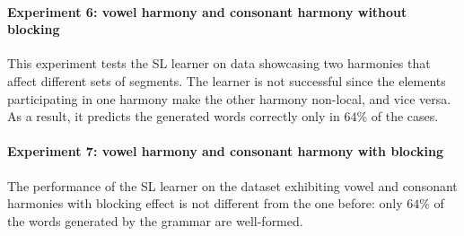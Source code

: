 \paragraph{Experiment 6: vowel harmony and consonant harmony without blocking}

This experiment tests the SL learner on data showcasing two harmonies that affect different sets of segments.
The learner is not successful since the elements participating in one harmony make the other harmony non-local, and vice versa.
As a result, it predicts the generated words correctly only in $64$\% of the cases.

\begin{table}[h!]
\centering
{}
\caption{SL learning of vowel and consonant harmonies without blockers; abstract representation.}
\end{table}


\paragraph{Experiment 7: vowel harmony and consonant harmony with blocking}

The performance of the SL learner on the dataset exhibiting vowel and consonant harmonies with blocking effect is not different from the one before: only $64$\% of the words generated by the grammar are well-formed.

